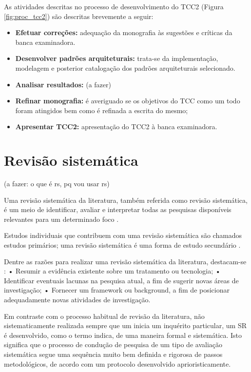 \pagebreak

As atividades descritas no processo de desenvolvimento do TCC2 (Figura \ref{fig:proc_tcc2}) são descritas brevemente a seguir:

\begin{itemize}
    \item \textbf{Efetuar correções:} adequação da monografia às sugestões e críticas da banca examinadora.
    \item \textbf{Desenvolver padrões arquiteturais:} trata-se da implementação, modelagem e posterior catalogação dos padrões arquiteturais selecionado.
    \item \textbf{Analisar resultados:} (a fazer)
    \item \textbf{Refinar monografia:} é averiguado se os objetivos do TCC como um todo foram atingidos bem como é refinada a escrita do mesmo;
    \item \textbf{Apresentar TCC2:} apresentação do TCC2 à banca examinadora.
\end{itemize}

\section{Revisão sistemática}

(a fazer: o que é rs, pq vou usar rs)


Uma revisão sistemática da literatura, também referida como revisão sistemática, é um meio de identificar, avaliar e interpretar todas as pesquisas disponíveis relevantes para um determinado foco \cite{kitchenham2004}. 

Estudos individuais que contribuem com uma revisão sistemática são chamados estudos primários; uma revisão sistemática é uma forma de estudo secundário \cite{kitchenham2004}.

Dentre as razões para realizar uma revisão sistemática da literatura, destacam-se \cite{kitchenham2004}:
• Resumir a evidência existente sobre um tratamento ou tecnologia;
• Identificar eventuais lacunas na pesquisa atual, a fim de sugerir novas áreas de investigação;
• Fornecer um framework ou background, a fim de posicionar adequadamente novas atividades de investigação.

Em contraste com o processo habitual de revisão da literatura, não sistematicamente realizada sempre que um inicia um inquérito particular, um SR é desenvolvido, como o termo indica, de uma maneira formal e sistemática. Isto significa que o processo de condução de pesquisa de um tipo de avaliação sistemática segue uma sequência muito bem definida e rigorosa de passos metodológicos, de acordo com um protocolo desenvolvido aprioristicamente.


